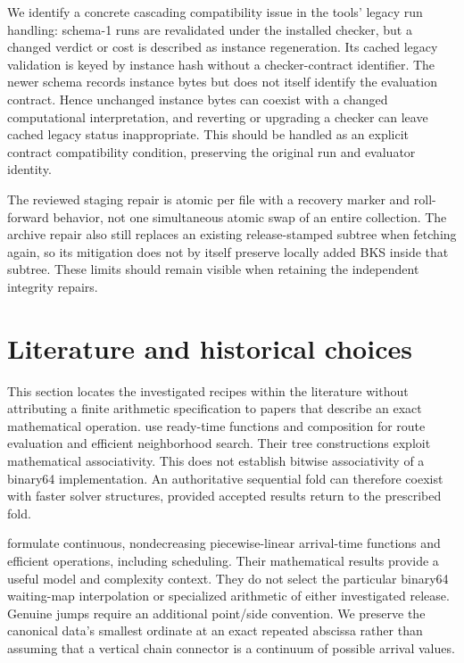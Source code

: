 We identify a concrete cascading compatibility issue in the tools' legacy run handling: schema-1 runs are revalidated under the installed checker, but a changed verdict or cost is described as instance regeneration. Its cached legacy validation is keyed by instance hash without a checker-contract identifier. The newer schema records instance bytes but does not itself identify the evaluation contract. Hence unchanged instance bytes can coexist with a changed computational interpretation, and reverting or upgrading a checker can leave cached legacy status inappropriate. This should be handled as an explicit contract compatibility condition, preserving the original run and evaluator identity.

The reviewed staging repair is atomic per file with a recovery marker and roll-forward behavior, not one simultaneous atomic swap of an entire collection. The archive repair also still replaces an existing release-stamped subtree when fetching again, so its mitigation does not by itself preserve locally added BKS inside that subtree. These limits should remain visible when retaining the independent integrity repairs.


\section{Literature and historical choices}

This section locates the investigated recipes within the literature without attributing a finite arithmetic specification to papers that describe an exact mathematical operation. \textcite{visserEfficientMoveEvaluations2020} use ready-time functions and composition for route evaluation and efficient neighborhood search. Their tree constructions exploit mathematical associativity. This does not establish bitwise associativity of a binary64 implementation. An authoritative sequential fold can therefore coexist with faster solver structures, provided accepted results return to the prescribed fold.

\textcite{blauthVehicleRoutingTimedependent2024} formulate continuous, nondecreasing piecewise-linear arrival-time functions and efficient operations, including scheduling. Their mathematical results provide a useful model and complexity context. They do not select the particular binary64 waiting-map interpolation or specialized arithmetic of either investigated release. Genuine jumps require an additional point/side convention. We preserve the canonical data's smallest ordinate at an exact repeated abscissa rather than assuming that a vertical chain connector is a continuum of possible arrival values.

